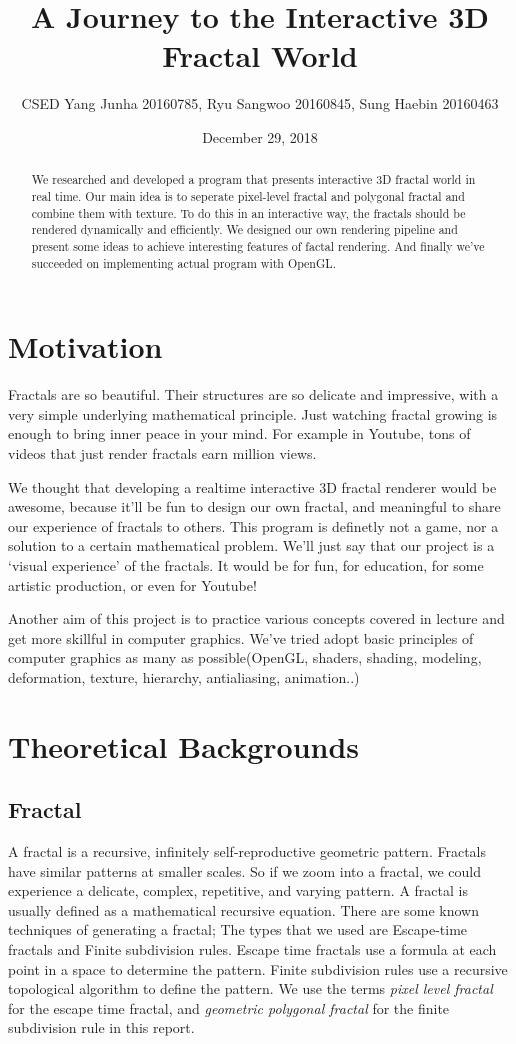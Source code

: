 \documentclass[a4paper]{article}
\title{A Journey to the Interactive 3D Fractal World}
\author{CSED Yang Junha 20160785, Ryu Sangwoo 20160845, Sung Haebin 20160463}
\date{December 29, 2018}
\begin{document}
\maketitle
\begin{abstract}
We researched and developed a program that presents interactive 3D fractal world in real time.
Our main idea is to seperate pixel-level fractal and polygonal fractal and combine them with texture.
To do this in an interactive way, the fractals should be rendered dynamically and efficiently.
We designed our own rendering pipeline and present some ideas to achieve interesting features of factal rendering.
And finally we've succeeded on implementing actual program with OpenGL.
\end{abstract}
\section{Motivation}
Fractals are so beautiful.
Their structures are so delicate and impressive, with a very simple underlying mathematical principle.
Just watching fractal growing is enough to bring inner peace in your mind.
For example in Youtube, tons of videos that just render fractals earn million views.

We thought that developing a realtime interactive 3D fractal renderer would be awesome,
because it'll be fun to design our own fractal, and meaningful to share our experience of fractals to others.
This program is definetly not a game, nor a solution to a certain mathematical problem.
We'll just say that our project is a `visual experience' of the fractals.
It would be for fun, for education, for some artistic production, or even for Youtube!

Another aim of this project is to practice various concepts covered in lecture and get more skillful in computer graphics.
We've tried adopt basic principles of computer graphics as many as possible(OpenGL, shaders, shading, modeling, deformation, texture, hierarchy, antialiasing, animation..)

\section{Theoretical Backgrounds}
\subsection{Fractal}
A fractal is a recursive, infinitely self-reproductive geometric pattern.
Fractals have similar patterns at smaller scales.
So if we zoom into a fractal, we could experience a delicate, complex, repetitive, and varying pattern.
A fractal is usually defined as a mathematical recursive equation.
There are some known techniques of generating a fractal;
The types that we used are Escape-time fractals and Finite subdivision rules.
Escape time fractals use a formula at each point in a space to determine the pattern.
Finite subdivision rules use a recursive topological algorithm to define the pattern.
We use the terms \textit{pixel level fractal} for the escape time fractal, and \textit{geometric polygonal fractal} for the finite subdivision rule in this report.
\end{document}
